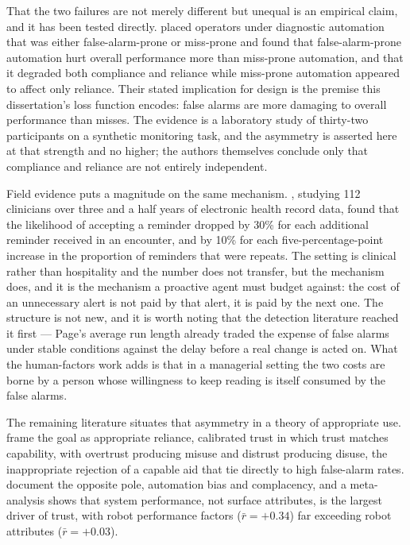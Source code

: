 That the two failures are not merely different but unequal is an empirical
claim, and it has been tested directly. \citet{dixon_independence_2007} placed
operators under diagnostic automation that was either false-alarm-prone or
miss-prone and found that false-alarm-prone automation hurt overall performance
more than miss-prone automation, and that it degraded both compliance and
reliance while miss-prone automation appeared to affect only reliance. Their
stated implication for design is the premise this dissertation's loss function
encodes: false alarms are more damaging to overall performance than misses. The
evidence is a laboratory study of thirty-two participants on a synthetic
monitoring task, and the asymmetry is asserted here at that strength and no
higher; the authors themselves conclude only that compliance and reliance are
not entirely independent.

Field evidence puts a magnitude on the same mechanism.
\citet{ancker_effects_2017}, studying 112 clinicians over three and a half
years of electronic health record data, found that the likelihood of accepting
a reminder dropped by 30\% for each additional reminder received in an
encounter, and by 10\% for each five-percentage-point increase in the
proportion of reminders that were repeats. The setting is clinical rather than
hospitality and the number does not transfer, but the mechanism does, and it is
the mechanism a proactive agent must budget against: the cost of an
unnecessary alert is not paid by that alert, it is paid by the next one. The
structure is not new, and it is worth noting that the detection literature
reached it first --- Page's average run length \citep{page_continuous_1954}
already traded the expense of false alarms under stable conditions against the
delay before a real change is acted on. What the human-factors work adds is
that in a managerial setting the two costs are borne by a person whose
willingness to keep reading is itself consumed by the false alarms.

The remaining literature situates that asymmetry in a theory of appropriate
use. \citet{lee_trust_2004} frame the goal as appropriate reliance, calibrated
trust in which trust matches capability, with overtrust producing misuse and
distrust producing disuse, the inappropriate rejection of a capable aid that
\citet{parasuraman_humans_1997} tie directly to high false-alarm rates.
\citet{parasuraman_complacency_2010} document the opposite pole, automation
bias and complacency, and a meta-analysis \citep{hancock_meta-analysis_2011}
shows that system performance, not surface attributes, is the largest driver of
trust, with robot performance factors ($\bar{r} = +0.34$) far exceeding robot
attributes ($\bar{r} = +0.03$).

